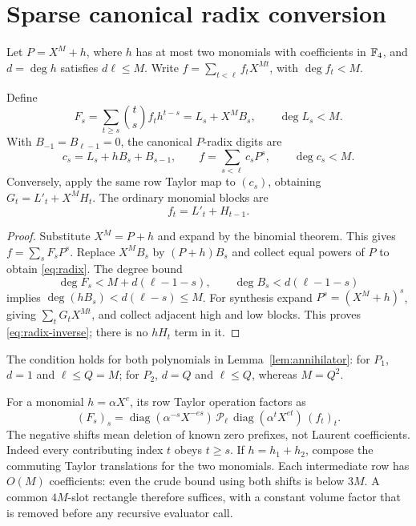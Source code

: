 \section{Sparse canonical radix conversion}\label{sec:radix}

Let $P=X^M+h$, where $h$ has at most two monomials with coefficients
in $\mathbb F_4$, and $d=\deg h$ satisfies $d\ell\leq M$.
Write $f=\sum_{t<\ell}f_tX^{Mt}$, with $\deg f_t<M$.

\begin{lemma}\label{lem:radix}
Define
\[
 F_s=\sum_{t\geq s}\binom ts f_t h^{t-s}
      =L_s+X^M B_s,\qquad \deg L_s<M.
\]
With $B_{-1}=B_{\ell-1}=0$, the canonical $P$-radix digits are
\begin{equation}\label{eq:radix}
 c_s=L_s+hB_s+B_{s-1},\qquad f=\sum_{s<\ell}c_sP^s,
 \qquad \deg c_s<M.
\end{equation}
Conversely, apply the same row Taylor map to $(c_s)$, obtaining
$G_t=L'_t+X^MH_t$. The ordinary monomial blocks are
\begin{equation}\label{eq:radix-inverse}
 f_t=L'_t+H_{t-1}.
\end{equation}
\end{lemma}
\begin{proof}
Substitute $X^M=P+h$ and expand by the binomial theorem. This gives
$f=\sum_sF_sP^s$. Replace $X^MB_s$ by $(P+h)B_s$ and collect
equal powers of $P$ to obtain \eqref{eq:radix}. The degree bound
\[
 \deg F_s<M+d(\ell-1-s),\qquad
 \deg B_s<d(\ell-1-s)
\]
implies $\deg(hB_s)<d(\ell-s)\leq M$.
For synthesis expand $P^s=(X^M+h)^s$, giving
$\sum_tG_tX^{Mt}$, and collect adjacent high and low blocks.
This proves \eqref{eq:radix-inverse}; there is no $hH_t$ term in it.
\end{proof}

The condition holds for both polynomials in
Lemma~\ref{lem:annihilator}: for $P_1$, $d=1$ and $\ell\leq Q=M$;
for $P_2$, $d=Q$ and $\ell\leq Q$, whereas $M=Q^2$.

For a monomial $h=\alpha X^e$, its row Taylor operation factors as
\begin{equation}\label{eq:monomial-taylor}
 (F_s)_s=
 \operatorname{diag}(\alpha^{-s}X^{-es})\,
 \mathcal P_\ell\,
 \operatorname{diag}(\alpha^tX^{et})\,(f_t)_t.
\end{equation}
The negative shifts mean deletion of known zero prefixes, not Laurent
coefficients. Indeed every contributing index $t$ obeys $t\geq s$.
If $h=h_1+h_2$, compose the commuting Taylor translations for the two
monomials. Each intermediate row has $O(M)$ coefficients: even the
crude bound using both shifts is below $3M$. A common $4M$-slot
rectangle therefore suffices, with a constant volume factor that is
removed before any recursive evaluator call.

